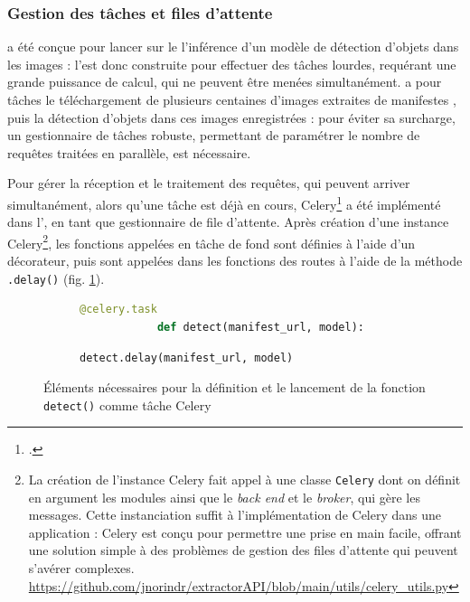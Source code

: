 	\subsubsection{Gestion des tâches et files d'attente}
	\exapi a été conçue pour lancer sur le \gpu l'inférence d'un modèle de détection d'objets dans les images : l'\api est donc construite pour effectuer des tâches lourdes, requérant une grande puissance de calcul, qui ne peuvent être menées simultanément. \exapi a pour tâches le téléchargement de plusieurs centaines d'images extraites de manifestes \iiif, puis la détection d'objets dans ces images enregistrées : pour éviter sa surcharge, un gestionnaire de tâches robuste, permettant de paramétrer le nombre de requêtes traitées en parallèle, est nécessaire.
	
	Pour gérer la réception et le traitement des requêtes, qui peuvent arriver simultanément, alors qu'une tâche est déjà en cours, Celery\footcite{CeleryDistributedTask} a été implémenté dans l'\api, en tant que gestionnaire de file d'attente. Après création d'une instance Celery\footnote{La création de l'instance Celery fait appel à une classe \texttt{Celery} dont on définit en argument les modules ainsi que le \textit{back end} et le \textit{broker}, qui gère les messages. Cette instanciation suffit à l'implémentation de Celery dans une application : Celery est conçu pour permettre une prise en main facile, offrant une solution simple à des problèmes de gestion des files d'attente qui peuvent s'avérer complexes. \url{https://github.com/jnorindr/extractorAPI/blob/main/utils/celery_utils.py}}, les fonctions appelées en tâche de fond sont définies à l'aide d'un décorateur, puis sont appelées dans les fonctions des routes à l'aide de la méthode \texttt{.delay()} (fig. \ref{fig:celery_exapi}).
	
	\begin{figure}[h]
		\begin{subfigure}{1\linewidth}
			\begin{lstlisting}[language=Python]
			@celery.task
			def detect(manifest_url, model):\end{lstlisting}
		\end{subfigure}
		\begin{subfigure}{1\linewidth}
			\begin{lstlisting}[language=Python]
			detect.delay(manifest_url, model)\end{lstlisting}
		\end{subfigure}
		\caption{Éléments nécessaires pour la définition et le lancement de la fonction \texttt{detect()} comme tâche Celery}
		\label{fig:celery_exapi}
	\end{figure}

